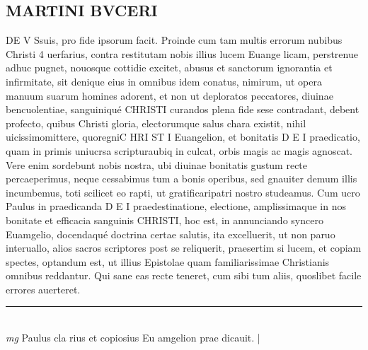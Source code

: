 \documentclass{article}
\begin{document}
\begin{pages}
\section*{MARTINI BVCERI }\pstart DE V Ssuis, pro fide ipsorum facit.  \pend\pstart Proinde cum tam multis errorum nubibus Christi 4 uerfarius, contra restitutam nobis illius lucem Euange licam, perstrenue adhuc pugnet, nouosque cottidie excitet, abusus et sanctorum ignorantia et infirmitate, sit denique eius in omnibus idem conatus, nimirum, ut opera manuum suarum homines adorent, et non ut deploratos peccatores, diuinae bencuolentiae, sanguiniqué CHRISTI curandos plena fide sese contradant, debent profecto, quibus Christi gloria, electorumque salus chara existit, nihil uicissimomittere, quoregniC HRI ST I Euangelion, et bonitatis D E I praedicatio, quam in primis uniucrsa scripturaubiq in culcat, orbis magis ac magis agnoscat.  Vere enim sordebunt nobis nostra, ubi diuinae bonitatis gustum recte percaeperimus, neque cessabimus tum a bonis operibus, sed gnauiter demum illis incumbemus, toti scilicet eo rapti, ut gratificaripatri nostro studeamus.  \pend\pstart Cum ucro Paulus in praedicanda D E I praedestinatione, electione, amplissimaque in nos bonitate et efficacia sanguinis CHRISTI, hoc est, in annunciando syncero Euamgelio, docendaqué doctrina certae salutis, ita excelluerit, ut non paruo interuallo, alios sacros scriptores post se reliquerit, praesertim si lucem, et copiam spectes, optandum est, ut illius Epistolae quam familiarissimae Christianis omnibus reddantur. Qui sane eas recte teneret, cum sibi tum aliis, quoslibet facile errores auerteret.  \pend
\vspace{0.5cm}\noindent
\vspace{0.2cm}\rule{1cm}{0.2pt}\\ 
\hspace{0.2cm}\textit{mg}
\footnotesize Paulus cla rius et copiosius Eu amgelion prae dicauit. 
\normalsize| 

\end{pages}
\end{document}
